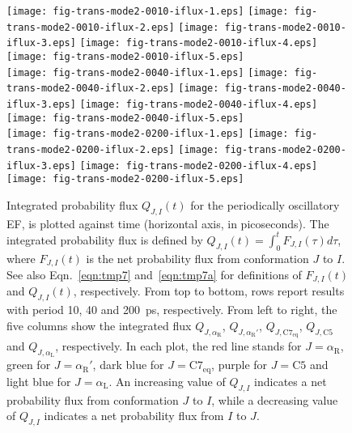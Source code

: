\documentclass[journal=jctcce,manuscript=manuscript]{achemso}
\newcommand{\confaa}[0]{{\alpha_{\textrm{R}}}}
\newcommand{\confab}[0]{{\alpha_{\textrm{R}}'}}
\newcommand{\confba}[0]{{\textrm{C}7_{\textrm{eq}}}}
\newcommand{\confbb}[0]{{\textrm{C}5}}
\newcommand{\confc}[0]{{\alpha_{\textrm{L}}}}
\begin{document}
\begin{figure*}
  \centering
  \texttt{[image: fig-trans-mode2-0010-iflux-1.eps]}
  \texttt{[image: fig-trans-mode2-0010-iflux-2.eps]}
  \texttt{[image: fig-trans-mode2-0010-iflux-3.eps]}
  \texttt{[image: fig-trans-mode2-0010-iflux-4.eps]}
  \texttt{[image: fig-trans-mode2-0010-iflux-5.eps]}\\
  \texttt{[image: fig-trans-mode2-0040-iflux-1.eps]}
  \texttt{[image: fig-trans-mode2-0040-iflux-2.eps]}
  \texttt{[image: fig-trans-mode2-0040-iflux-3.eps]}
  \texttt{[image: fig-trans-mode2-0040-iflux-4.eps]}
  \texttt{[image: fig-trans-mode2-0040-iflux-5.eps]}\\
  \texttt{[image: fig-trans-mode2-0200-iflux-1.eps]}
  \texttt{[image: fig-trans-mode2-0200-iflux-2.eps]}
  \texttt{[image: fig-trans-mode2-0200-iflux-3.eps]}
  \texttt{[image: fig-trans-mode2-0200-iflux-4.eps]}
  \texttt{[image: fig-trans-mode2-0200-iflux-5.eps]}\\
  \caption{
    Integrated probability flux $Q_{J,I}(t)$ for the periodically
    oscillatory EF, is plotted against time (horizontal axis, in picoseconds).
    The integrated
    probability flux is defined by $Q_{J,I}(t) = \int_0^t F_{J,I}(\tau) d\tau$, where
    $F_{J,I}(t)$ is the net probability flux from conformation $J$ to $I$.
    See also Eqn.~\eqref{eqn:tmp7} and~\eqref{eqn:tmp7a} for definitions
    of $F_{J,I}(t)$ and $Q_{J,I}(t)$, respectively.
    From top to bottom, rows report results with  period 10, 40 and 200~ps, respectively.
    From left to right, the five
    columns show the integrated flux $Q_{J,\confaa}$, $Q_{J,\confab}$,
    $Q_{J,\confba}$, $Q_{J,\confbb}$ and $Q_{J,\confc}$, respectively. In each plot,
    the red line stands for $J=\confaa$, green for $J=\confab$, dark blue for $J=\confba$,
    purple for $J=\confbb$ and light blue for $J=\confc$.
    An increasing value of $Q_{J,I}$ indicates a net probability
      flux from conformation $J$ to $I$,
      while a decreasing value of $Q_{J,I}$ indicates a net probability
      flux from $I$ to $J$.
  }
  \label{fig:tmp10}
\end{figure*}
\end{document}
